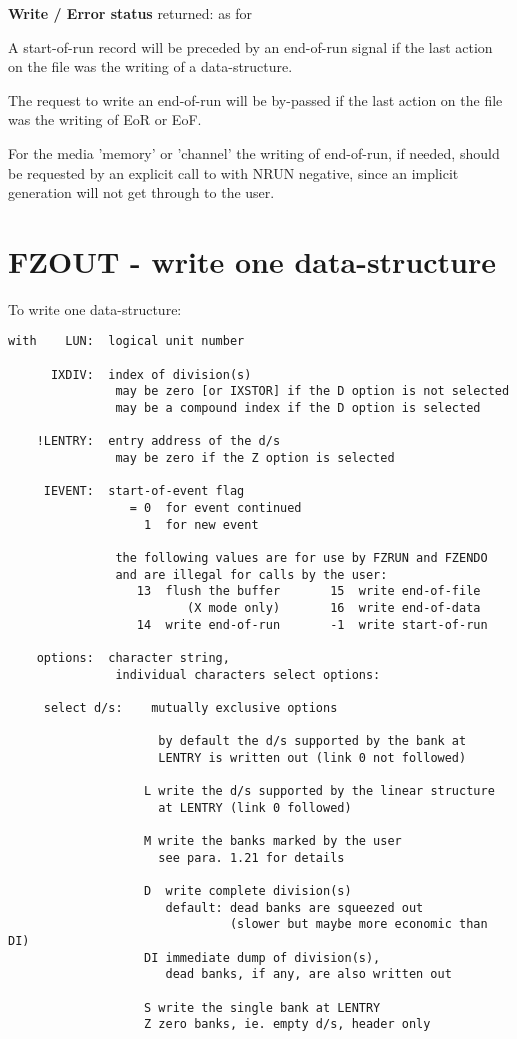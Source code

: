 \textbf{Write / Error status} returned: as for 

A start-of-run record will be preceded by an end-of-run signal
if the last action on the file was the writing of a data-structure.

The request to write an end-of-run will be by-passed if the last
action on the file was the writing of EoR or EoF.

For the media 'memory' or 'channel' the writing of end-of-run,
if needed, should be requested by an explicit call to 
with NRUN negative, since an implicit generation will not
get through to the user.

\section{FZOUT - write one data-structure}

To write one data-structure:

\begin{verbatim}
with    LUN:  logical unit number

      IXDIV:  index of division(s)
               may be zero [or IXSTOR] if the D option is not selected
               may be a compound index if the D option is selected

    !LENTRY:  entry address of the d/s
               may be zero if the Z option is selected

     IEVENT:  start-of-event flag
                 = 0  for event continued
                   1  for new event

               the following values are for use by FZRUN and FZENDO
               and are illegal for calls by the user:
                  13  flush the buffer       15  write end-of-file
                         (X mode only)       16  write end-of-data
                  14  write end-of-run       -1  write start-of-run

    options:  character string,
               individual characters select options:

     select d/s:    mutually exclusive options

                     by default the d/s supported by the bank at
                     LENTRY is written out (link 0 not followed)

                   L write the d/s supported by the linear structure
                     at LENTRY (link 0 followed)

                   M write the banks marked by the user
                     see para. 1.21 for details

                   D  write complete division(s)
                      default: dead banks are squeezed out
                               (slower but maybe more economic than DI)
                   DI immediate dump of division(s),
                      dead banks, if any, are also written out

                   S write the single bank at LENTRY
                   Z zero banks, ie. empty d/s, header only
\end{verbatim}

